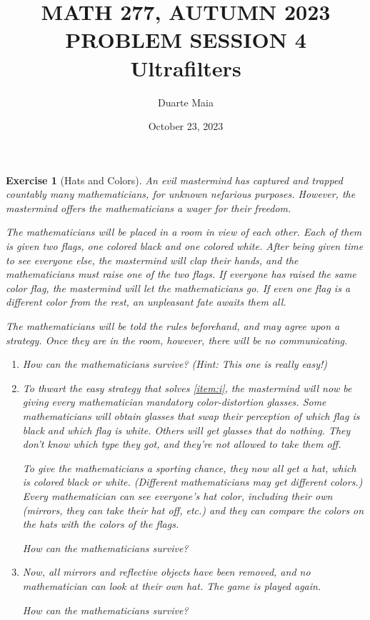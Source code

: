 \documentclass{article}
\title{MATH 277, AUTUMN 2023\\PROBLEM SESSION 4\\Ultrafilters}
\author{Duarte Maia}
\date{October 23, 2023}
\newtheorem{ex}{Exercise}
\theoremstyle{nonumberplain}
\begin{document}
\maketitle

\begin{ex}[Hats and Colors]
An evil mastermind has captured and trapped countably many mathematicians, for unknown nefarious purposes. However, the mastermind offers the mathematicians a wager for their freedom.

The mathematicians will be placed in a room in view of each other. Each of them is given two flags, one colored black and one colored white. After being given time to see everyone else, the mastermind will clap their hands, and the mathematicians must raise one of the two flags. If everyone has raised the same color flag, the mastermind will let the mathematicians go. If even one flag is a different color from the rest, an unpleasant fate awaits them all.

The mathematicians will be told the rules beforehand, and may agree upon a strategy. Once they are in the room, however, there will be no communicating.

\begin{enumerate}
\item\label{item:i} How can the mathematicians survive? (Hint: This one is really easy!)
\item To thwart the easy strategy that solves \ref{item:i}, the mastermind will now be giving every mathematician mandatory color-distortion glasses. Some mathematicians will obtain glasses that swap their perception of which flag is black and which flag is white. Others will get glasses that do nothing. They don't know which type they got, and they're not allowed to take them off.

To give the mathematicians a sporting chance, they now all get a hat, which is colored black or white. (Different mathematicians may get different colors.) Every mathematician can see everyone's hat color, including their own (mirrors, they can take their hat off, etc.) and they can compare the colors on the hats with the colors of the flags.

How can the mathematicians survive?

\item Now, all mirrors and reflective objects have been removed, and no mathematician can look at their own hat. The game is played again.

How can the mathematicians survive?
\end{enumerate}
\end{ex}
\end{document}
